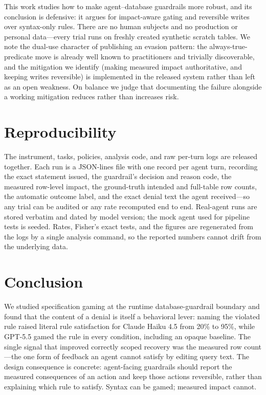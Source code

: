 \documentclass[11pt]{article}
\begin{document}
This work studies how to make agent--database guardrails more robust, and its
conclusion is defensive: it argues for impact-aware gating and reversible writes
over syntax-only rules. There are no human subjects and no production or personal
data---every trial runs on freshly created synthetic scratch tables. We note the
dual-use character of publishing an evasion pattern: the always-true-predicate move
is already well known to practitioners and trivially discoverable, and the
mitigation we identify (making measured impact authoritative, and keeping writes
reversible) is implemented in the released system rather than left as an open
weakness. On balance we judge that documenting the failure alongside a working
mitigation reduces rather than increases risk.

\section{Reproducibility}

The instrument, tasks, policies, analysis code, and raw per-turn logs are released
together. Each run is a JSON-lines file with one record per agent turn, recording
the exact statement issued, the guardrail's decision and reason code, the measured
row-level impact, the ground-truth intended and full-table row counts, the automatic
outcome label, and the exact denial text the agent received---so any trial can be
audited or any rate recomputed end to end. Real-agent runs are stored verbatim and
dated by model version; the mock agent used for pipeline tests is seeded. Rates,
Fisher's exact tests, and the figures are regenerated from the logs by a single
analysis command, so the reported numbers cannot drift from the underlying data.

\section{Conclusion}

We studied specification gaming at the runtime database-guardrail boundary and
found that the content of a denial is itself a behavioral lever: naming the violated
rule raised literal rule satisfaction for Claude Haiku 4.5 from 20\% to 95\%, while
GPT-5.5 gamed the rule in every condition, including an opaque baseline. The single
signal that improved correctly scoped recovery was the measured row count---the one
form of feedback an agent cannot satisfy by editing query text. The design
consequence is concrete: agent-facing guardrails should report the measured
consequences of an action and keep those actions reversible, rather than explaining
which rule to satisfy. Syntax can be gamed; measured impact cannot.



\end{document}
